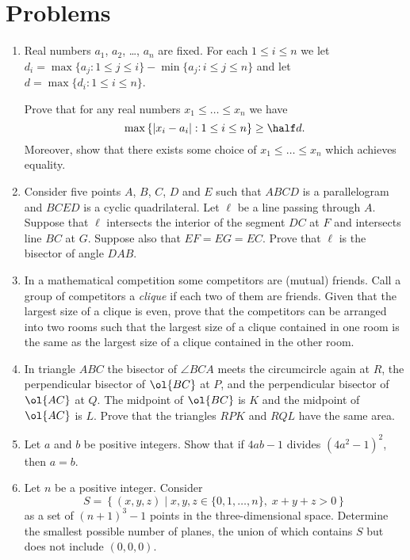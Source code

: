 \documentclass[11pt]{scrartcl}
\begin{document}
\section{Problems}
\begin{enumerate}[\bfseries 1.]
\item %
Real numbers $a_1$, $a_2$, \dots, $a_n$ are fixed.
For each $1 \le i \le n$ we let
$d_i = \max\{a_j : 1 \le j \le i\} - \min\{a_j : i \le j \le n\}$
and let $d = \max \{d_i : 1 \le i \le n\}$.

\begin{enumerate}[(a)]
  \ii Prove that for any real numbers $x_1 \le \dots \le x_n$ we have
  \[
    \max \left\{ \left\lvert x_i - a_i \right\rvert :
      1 \le i \le n \right\}
      \ge \half d.
  \]
  \ii Moreover, show that there exists some
  choice of $x_1 \le \dots \le x_n$ which achieves equality.
\end{enumerate}

\item %
Consider five points $A$, $B$, $C$, $D$ and $E$
such that $ABCD$ is a parallelogram and $BCED$ is a cyclic quadrilateral.
Let $\ell$ be a line passing through $A$.
Suppose that $\ell$ intersects the interior of the segment $DC$ at $F$
and intersects line $BC$ at $G$.
Suppose also that $EF = EG = EC$.
Prove that $\ell$ is the bisector of angle $ DAB$.

\item %
In a mathematical competition some competitors are (mutual) friends.
Call a group of competitors a \emph{clique} if each two of them are friends.
Given that the largest size of a clique is even,
prove that the competitors can be arranged into two rooms
such that the largest size of a clique contained in one room
is the same as the largest size of a clique contained in the other room.

\item %
In triangle $ABC$ the bisector of $\angle BCA$
meets the circumcircle again at $R$,
the perpendicular bisector of $\ol{BC}$ at $P$,
and the perpendicular bisector of $\ol{AC}$ at $Q$.
The midpoint of $\ol{BC}$ is $K$ and the midpoint of $\ol{AC}$ is $L$.
Prove that the triangles $RPK$ and $RQL$ have the same area.

\item %
Let $a$ and $b$ be positive integers.
Show that if $4ab - 1$ divides $(4a^{2} - 1)^{2}$, then $a = b$.

\item %
Let $n$ be a positive integer.
Consider
\[ S = \left\{ (x,y,z) \mid
  x,y,z \in \{ 0, 1, \dots, n\}, \;
  x+y+z > 0 \right\} \]
as a set of $(n+1)^3-1$ points in the three-dimensional space.
Determine the smallest possible number of planes,
the union of which contains $S$ but does not include $(0,0,0)$.

\end{enumerate}
\pagebreak
\end{document}
